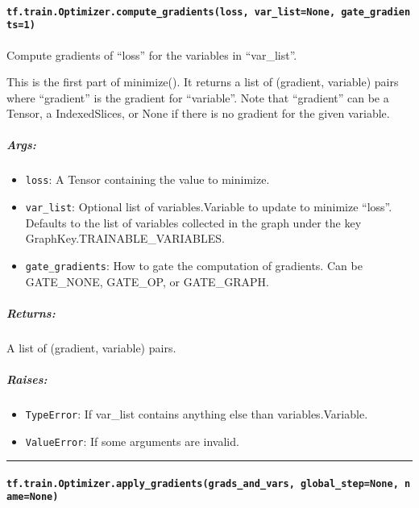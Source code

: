 \paragraph{\texorpdfstring{\texttt{tf.train.Optimizer.compute\_gradients(loss,\ var\_list=None,\ gate\_gradients=1)}
}{tf.train.Optimizer.compute\_gradients(loss, var\_list=None, gate\_gradients=1) }}\label{tf.train.optimizer.computeux5fgradientsloss-varux5flistnone-gateux5fgradients1}

Compute gradients of ``loss'' for the variables in ``var\_list''.

This is the first part of minimize(). It returns a list of (gradient,
variable) pairs where ``gradient'' is the gradient for ``variable''.
Note that ``gradient'' can be a Tensor, a IndexedSlices, or None if
there is no gradient for the given variable.

\subparagraph{Args: }\label{args-2}

\begin{itemize}
\tightlist
\item
  \texttt{loss}: A Tensor containing the value to minimize.
\item
  \texttt{var\_list}: Optional list of variables.Variable to update to
  minimize ``loss''. Defaults to the list of variables collected in the
  graph under the key GraphKey.TRAINABLE\_VARIABLES.
\item
  \texttt{gate\_gradients}: How to gate the computation of gradients.
  Can be GATE\_NONE, GATE\_OP, or GATE\_GRAPH.
\end{itemize}

\subparagraph{Returns: }\label{returns-1}

A list of (gradient, variable) pairs.

\subparagraph{Raises: }\label{raises-2}

\begin{itemize}
\tightlist
\item
  \texttt{TypeError}: If var\_list contains anything else than
  variables.Variable.
\item
  \texttt{ValueError}: If some arguments are invalid.
\end{itemize}

\begin{center}\rule{0.5\linewidth}{\linethickness}\end{center}

\paragraph{\texorpdfstring{\texttt{tf.train.Optimizer.apply\_gradients(grads\_and\_vars,\ global\_step=None,\ name=None)}
}{tf.train.Optimizer.apply\_gradients(grads\_and\_vars, global\_step=None, name=None) }}\label{tf.train.optimizer.applyux5fgradientsgradsux5fandux5fvars-globalux5fstepnone-namenone}


